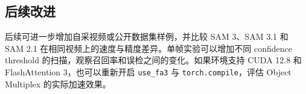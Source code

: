\documentclass[UTF8,a4paper,zihao=-4,fontset=none]{ctexart}
\begin{document}
\subsection{后续改进}

后续可进一步增加自采视频或公开数据集样例，并比较 SAM 3、SAM 3.1 和 SAM 2.1 在相同视频上的速度与精度差异。单帧实验可以增加不同 confidence threshold 的扫描，观察召回率和误检之间的变化。如果环境支持 CUDA 12.8 和 FlashAttention 3，也可以重新开启 \texttt{use\_fa3} 与 \texttt{torch.compile}，评估 Object Multiplex 的实际加速效果。

\clearpage


\end{document}
